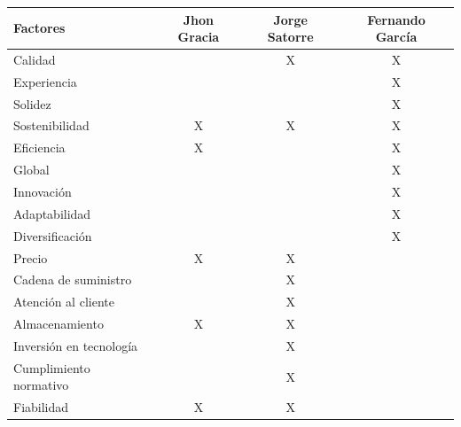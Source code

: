 \documentclass{article}
\begin{document}
\begin{table}[h]
    \centering
    \begin{tabular}{|p{5cm}|c|c|c|}
        \hline
        \textbf{Factores} & \textbf{Jhon Gracia} & \textbf{Jorge Satorre} & \textbf{Fernando García} \\ \hline
        Calidad           &                     & X                      & X                         \\ \hline
        Experiencia       &                      &                    & X                         \\ \hline
        Solidez           &                      &                       & X                         \\ \hline
        Sostenibilidad    & X                    & X                      & X                        \\ \hline
        Eficiencia        & X                    &                        & X                        \\ \hline
        Global            &                      &                       &   X                       \\ \hline
        Innovación        &                      &                      &  X                        \\ \hline
        Adaptabilidad     &                      &                    &  X                        \\ \hline
        Diversificación   &                      &                   &  X                        \\ \hline
        Precio            & X                    & X                      &                          \\ \hline
        Cadena de suministro & & X              &                          \\ \hline
        Atención al cliente & & X               &                          \\ \hline
        Almacenamiento    & X                    &  X                     &                          \\ \hline
        Inversión en tecnología & & X           &                          \\ \hline
        Cumplimiento normativo & & X            &                         \\ \hline
        Fiabilidad        & X                    & X                      &                          \\ \hline

\end{tabular}
\end{table}
\end{document}
